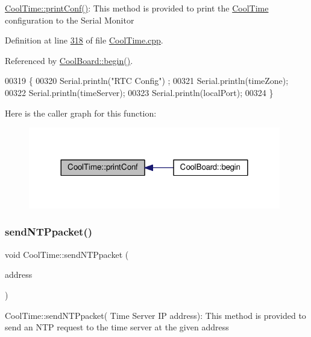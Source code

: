 \hyperlink{class_cool_time_af355e7f9b3898211cd2ff25eab5933b1}{Cool\+Time\+::print\+Conf()}\+: This method is provided to print the \hyperlink{class_cool_time}{Cool\+Time} configuration to the Serial Monitor 

Definition at line \hyperlink{_cool_time_8cpp_source_l00318}{318} of file \hyperlink{_cool_time_8cpp_source}{Cool\+Time.\+cpp}.



Referenced by \hyperlink{_cool_board_8cpp_source_l00021}{Cool\+Board\+::begin()}.


\begin{DoxyCode}
00319 \{
00320     Serial.println(\textcolor{stringliteral}{"RTC Config"}) ;
00321     Serial.println(timeZone);
00322     Serial.println(timeServer);
00323     Serial.println(localPort);
00324 \}
\end{DoxyCode}
Here is the caller graph for this function\+:
\nopagebreak
\begin{figure}[H]
\begin{center}
\leavevmode
\includegraphics[width=312pt]{class_cool_time_af355e7f9b3898211cd2ff25eab5933b1_icgraph}
\end{center}
\end{figure}
\mbox{\label{class_cool_time_a236a38d120dc53bc67456d763838c5a1}} 
\subsubsection{\texorpdfstring{send\+N\+T\+Ppacket()}{sendNTPpacket()}}
{\footnotesize\ttfamily void Cool\+Time\+::send\+N\+T\+Ppacket (\begin{DoxyParamCaption}\item[{I\+P\+Address \&}]{address }\end{DoxyParamCaption})}

Cool\+Time\+::send\+N\+T\+Ppacket( Time Server I\+P address)\+: This method is provided to send an N\+TP request to the time server at the given address 

